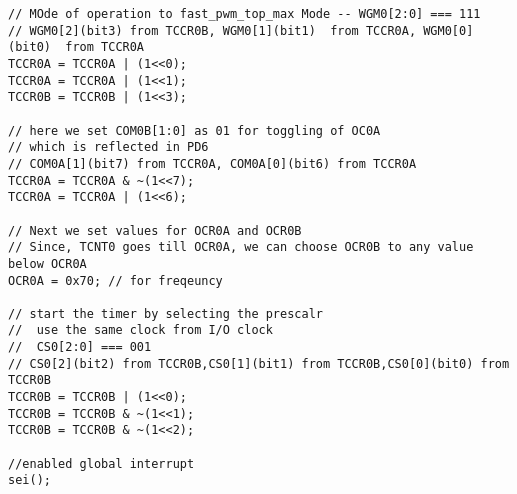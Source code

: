 \begin{verbatim}
// MOde of operation to fast_pwm_top_max Mode -- WGM0[2:0] === 111
// WGM0[2](bit3) from TCCR0B, WGM0[1](bit1)  from TCCR0A, WGM0[0](bit0)  from TCCR0A
TCCR0A = TCCR0A | (1<<0);
TCCR0A = TCCR0A | (1<<1);
TCCR0B = TCCR0B | (1<<3);	

// here we set COM0B[1:0] as 01 for toggling of OC0A
// which is reflected in PD6
// COM0A[1](bit7) from TCCR0A, COM0A[0](bit6) from TCCR0A
TCCR0A = TCCR0A & ~(1<<7);
TCCR0A = TCCR0A | (1<<6);

// Next we set values for OCR0A and OCR0B
// Since, TCNT0 goes till OCR0A, we can choose OCR0B to any value below OCR0A
OCR0A = 0x70; // for freqeuncy

// start the timer by selecting the prescalr
//  use the same clock from I/O clock
//  CS0[2:0] === 001
// CS0[2](bit2) from TCCR0B,CS0[1](bit1) from TCCR0B,CS0[0](bit0) from TCCR0B
TCCR0B = TCCR0B | (1<<0);
TCCR0B = TCCR0B & ~(1<<1);
TCCR0B = TCCR0B & ~(1<<2);

//enabled global interrupt
sei();
\end{verbatim}

